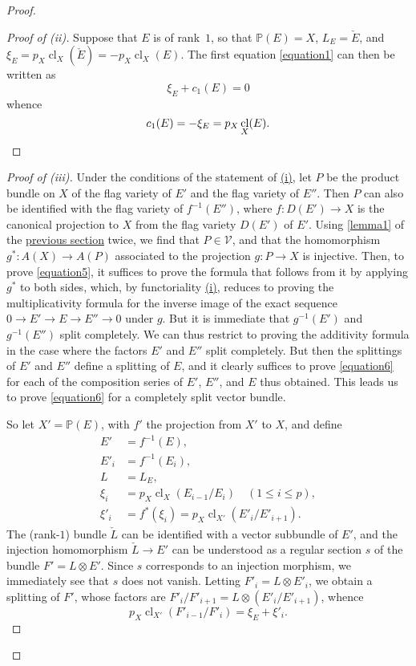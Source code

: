 \documentclass{article}
\theoremstyle{plain}
\theoremstyle{definition}
\newcommand{\cat}[1]{{\mathcal{#1}}}
\renewcommand{\leq}{\leqslant}
\DeclareMathOperator{\cl}{cl}
\begin{document}
\begin{proof}
  \begin{proof}[Proof of \rm{(ii)}]
    Suppose that $E$ is of rank~$1$, so that $\mathbb{P}(E)=X$, $L_E=\check{E}$, and $\xi_E = p_X\cl_X(\check{E}) = -p_X\cl_X(E)$.
    The first equation \cref{equation1} can then be written as
    \[
      \xi_E + c_1(E) = 0
    \]
    whence
    \[
      c_1(E) = -\xi_E = p_X\cl_X(E).\qedhere
    \]
  \end{proof}

  \begin{proof}[Proof of \rm{(iii)}]
    Under the conditions of the statement of \hyperref[theorem1i]{(i)}, let $P$ be the product bundle on $X$ of the flag variety of $E'$ and the flag variety of $E''$.
    Then $P$ can also be identified with the flag variety of $f^{-1}(E'')$, where $f\colon D(E')\to X$ is the canonical projection to $X$ from the flag variety $D(E')$ of $E'$.
    Using \cref{lemma1} of the \hyperref[section2]{previous section} twice, we find that $P\in\cat{V}$, and that the homomorphism $g^*\colon A(X)\to A(P)$ associated to the projection $g\colon P\to X$ is injective.
    Then, to prove \cref{equation5}, it suffices to prove the formula that follows from it by applying $g^*$ to both sides, which, by functoriality \hyperref[theorem1i]{(i)}, reduces to proving the multiplicativity formula for the inverse image of the exact sequence $0\to E'\to E\to E''\to 0$ under $g$.
    But it is immediate that $g^{-1}(E')$ and $g^{-1}(E'')$ split completely.
    We can thus restrict to proving the additivity formula in the case where the factors $E'$ and $E''$ split completely.
    But then the splittings of $E'$ and $E''$ define a splitting of $E$, and it clearly suffices to prove \cref{equation6} for each of the composition series of $E'$, $E''$, and $E$ thus obtained.
    This leads us to prove \cref{equation6} for a completely split vector bundle.

    So let $X'=\mathbb{P}(E)$, with $f'$ the projection from $X'$ to $X$, and define
    \[
      \begin{aligned}
        E' &= f^{-1}(E),
      \\E'_i &= f^{-1}(E_i),
      \\L &= L_E,
      \\\xi_i &= p_X\cl_X(E_{i-1}/E_i)\quad(1\leq i\leq p),
      \\\xi'_i &= f^*(\xi_i) = p_X\cl_{X'}(E'_i/E'_{i+1}).
      \end{aligned}
    \]
    The (rank-$1$) bundle $\check{L}$ can be identified with a vector subbundle of $E'$, and the injection homomorphism $\check{L}\to E'$ can be understood as a regular section $s$ of the bundle $F'=L\otimes E'$.
    Since $s$ corresponds to an injection morphism, we immediately see that $s$ does not vanish.
    Letting $F'_i=L\otimes E'_i$, we obtain a splitting of $F'$, whose factors are $F'_i/F'_{i+1} = L\otimes(E'_i/E'_{i+1})$, whence
    \[
      p_X\cl_{X'}(F'_{i-1}/F'_{i}) = \xi_E+\xi'_i.
    \]


\end{proof}
\end{proof}
\end{document}
